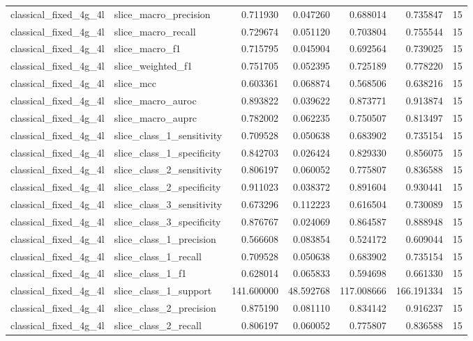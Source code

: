 \begin{tabular}{llrrrrr}
classical_fixed_4g_4l & slice_macro_precision & 0.711930 & 0.047260 & 0.688014 & 0.735847 & 15 \\
classical_fixed_4g_4l & slice_macro_recall & 0.729674 & 0.051120 & 0.703804 & 0.755544 & 15 \\
classical_fixed_4g_4l & slice_macro_f1 & 0.715795 & 0.045904 & 0.692564 & 0.739025 & 15 \\
classical_fixed_4g_4l & slice_weighted_f1 & 0.751705 & 0.052395 & 0.725189 & 0.778220 & 15 \\
classical_fixed_4g_4l & slice_mcc & 0.603361 & 0.068874 & 0.568506 & 0.638216 & 15 \\
classical_fixed_4g_4l & slice_macro_auroc & 0.893822 & 0.039622 & 0.873771 & 0.913874 & 15 \\
classical_fixed_4g_4l & slice_macro_auprc & 0.782002 & 0.062235 & 0.750507 & 0.813497 & 15 \\
classical_fixed_4g_4l & slice_class_1_sensitivity & 0.709528 & 0.050638 & 0.683902 & 0.735154 & 15 \\
classical_fixed_4g_4l & slice_class_1_specificity & 0.842703 & 0.026424 & 0.829330 & 0.856075 & 15 \\
classical_fixed_4g_4l & slice_class_2_sensitivity & 0.806197 & 0.060052 & 0.775807 & 0.836588 & 15 \\
classical_fixed_4g_4l & slice_class_2_specificity & 0.911023 & 0.038372 & 0.891604 & 0.930441 & 15 \\
classical_fixed_4g_4l & slice_class_3_sensitivity & 0.673296 & 0.112223 & 0.616504 & 0.730089 & 15 \\
classical_fixed_4g_4l & slice_class_3_specificity & 0.876767 & 0.024069 & 0.864587 & 0.888948 & 15 \\
classical_fixed_4g_4l & slice_class_1_precision & 0.566608 & 0.083854 & 0.524172 & 0.609044 & 15 \\
classical_fixed_4g_4l & slice_class_1_recall & 0.709528 & 0.050638 & 0.683902 & 0.735154 & 15 \\
classical_fixed_4g_4l & slice_class_1_f1 & 0.628014 & 0.065833 & 0.594698 & 0.661330 & 15 \\
classical_fixed_4g_4l & slice_class_1_support & 141.600000 & 48.592768 & 117.008666 & 166.191334 & 15 \\
classical_fixed_4g_4l & slice_class_2_precision & 0.875190 & 0.081110 & 0.834142 & 0.916237 & 15 \\
classical_fixed_4g_4l & slice_class_2_recall & 0.806197 & 0.060052 & 0.775807 & 0.836588 & 15 \\

\end{tabular}
